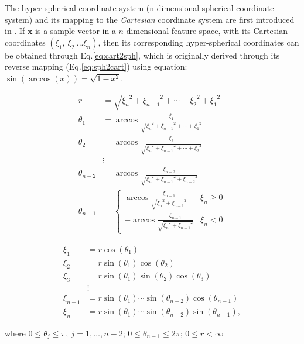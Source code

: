 The hyper-spherical coordinate system (n-dimensional spherical coordinate system) and its mapping to the \textit{Cartesian} coordinate system are first introduced in \cite{nsphere}. If $\mathbf{x}$ is a sample vector in 
a $n$-dimensional feature space, with its Cartesian coordinates $(\xi_1,~\xi_2~... \xi_n)$, then its corresponding hyper-spherical coordinates can be obtained through Eq.\ref{eq:cart2sph}, which is originally derived through its reverse mapping (Eq.\ref{eq:sph2cart}) using equation: $\sin(\arccos(x)) = \sqrt{1-x^2}$.



\begin{align}
\label{eq:cart2sph}
\nonumber
r      &= \sqrt{{\xi_n}^2 + {\xi_{n-1}}^2 + \cdots + {\xi_2}^2 + {\xi_1}^2} \\
\nonumber
\theta_1 &= \arccos \frac{\xi_{1}}{\sqrt{{\xi_n}^2+{\xi_{n-1}}^2+\cdots+{\xi_1}^2}} \\
\nonumber
 \theta_2 &= \arccos \frac{\xi_{2}}{\sqrt{{\xi_n}^2+{\xi_{n-1}}^2+\cdots+{\xi_2}^2}} \\
\nonumber
        &\vdots\\
\nonumber
 \theta_{n-2} &=\arccos \frac{\xi_{n-2}}{\sqrt{{\xi_n}^2+{\xi_{n-1}}^2+{\xi_{n-2}}^2}} \\
 \theta_{n-1} &= 
 \begin{cases}
     \arccos \frac{\xi_{n-1}}{\sqrt{{\xi_n}^2+{\xi_{n-1}}^2}} & \xi_n\geq 0 \\
     - \arccos \frac{\xi_{n-1}}{\sqrt{{\xi_n}^2+{\xi_{n-1}}^2}} & \xi_n < 0
 \end{cases} 
\end{align}


\begin{align}
\label{eq:sph2cart}
\nonumber
\xi_1 &= r \cos(\theta_1) \\
\nonumber
\xi_2 &= r \sin(\theta_1) \cos(\theta_2) \\
\nonumber
\xi_3 &= r \sin(\theta_1) \sin(\theta_2) \cos(\theta_3) \\
\nonumber
    &\vdots\\
\nonumber
\xi_{n-1} &= r \sin(\theta_1) \cdots \sin(\theta_{n-2}) \cos(\theta_{n-1}) \\
\xi_n &= r \sin(\theta_1) \cdots \sin(\theta_{n-2}) \sin(\theta_{n-1}),
\end{align}


where $0\leq \theta_j\leq\pi,~j=1,\dots ,n-2$; $0\leq \theta_{n-1}\leq 2 \pi$; $0\leq r<\infty$
 
